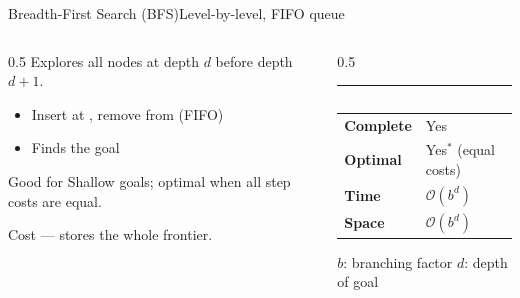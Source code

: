 \documentclass[aspectratio=169,11pt]{beamer}
\begin{document}
\begin{frame}{Breadth-First Search (BFS)}{Level-by-level, FIFO queue}
  \begin{columns}[T]
    \begin{column}{0.5\textwidth}
      Explores all nodes at depth $d$ before depth $d{+}1$.
      \begin{itemize}\small
        \item Insert at , remove from  (FIFO)
        \item Finds the  goal
      \end{itemize}
      \begin{exampleblock}{Good for}
        \small Shallow goals; optimal when all step costs are equal.
      \end{exampleblock}
      \begin{alertblock}{Cost}
        \small {} — stores the whole frontier.
      \end{alertblock}
    \end{column}
    \begin{column}{0.5\textwidth}
      \small
      \renewcommand{\arraystretch}{1.3}
      \begin{tabularx}{\linewidth}{@{}>{\bfseries}l >{\raggedright\arraybackslash}X@{}}
        \toprule
        \rowcolor{PrimaryDark}
        \textcolor{white}{Property} & \textcolor{white}{Value} \\
        \midrule
        Complete & Yes \\
        \rowcolor{PrimaryLight!25}
        Optimal & Yes$^\ast$ (equal costs) \\
        Time & $\mathcal{O}(b^{d})$ \\
        \rowcolor{PrimaryLight!25}
        Space & $\mathcal{O}(b^{d})$ \\
        \bottomrule
      \end{tabularx}
      \vspace{0.4em}
      \centering\scriptsize $b$: branching factor \quad $d$: depth of goal
    \end{column}
  \end{columns}
\end{frame}
\end{document}
